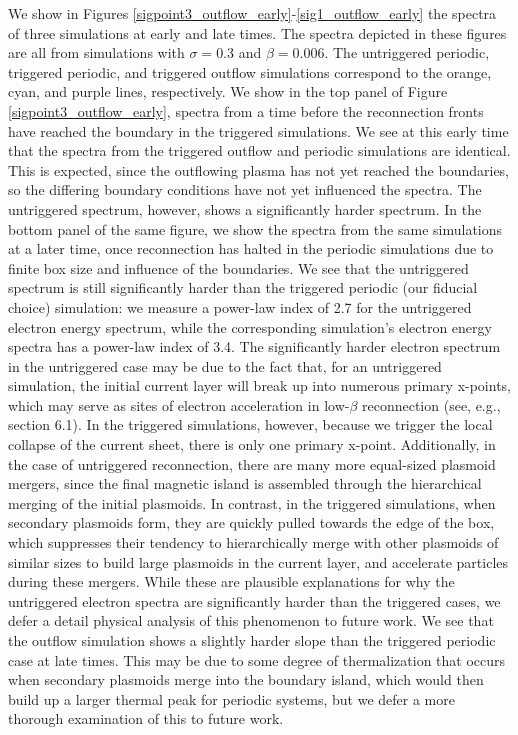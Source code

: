We show in Figures \ref{sigpoint3_outflow_early}-\ref{sig1_outflow_early} the spectra of three simulations at early and late times.  The spectra depicted in these figures are all from simulations with $\sigma=0.3$ and $\beta=0.006$.  The untriggered periodic, triggered periodic, and triggered outflow simulations correspond to the orange, cyan, and purple lines, respectively.  We show in the top panel of Figure \ref{sigpoint3_outflow_early}, spectra from a time before the reconnection fronts have reached the boundary in the triggered simulations.  We see at this early time that the spectra from the triggered outflow and periodic simulations are identical.  This is expected, since the outflowing plasma has not yet reached the boundaries, so the differing boundary conditions have not yet influenced the spectra.  The untriggered spectrum, however, shows a significantly harder spectrum.  In the bottom panel of the same figure, we show the spectra from the same simulations at a later time, once reconnection has halted in the periodic simulations due to finite box size and influence of the boundaries.  We see that the untriggered spectrum is still significantly harder than the triggered periodic (our fiducial choice) simulation: we measure a power-law index of 2.7 for the untriggered electron energy spectrum, while the corresponding simulation's electron energy spectra has a power-law index of 3.4.  The significantly harder electron spectrum in the untriggered case may be due to the fact that, for an untriggered simulation, the initial current layer will break up into numerous primary x-points, which may serve as sites of electron acceleration in low-$\beta$ reconnection (see, e.g., section 6.1).  In the triggered simulations, however, because we trigger the local collapse of the current sheet, there is only one primary x-point.  Additionally, in the case of untriggered reconnection, there are many more equal-sized plasmoid mergers, since the final magnetic island is assembled through the hierarchical merging of the initial plasmoids.  In contrast, in the triggered simulations, when secondary plasmoids form, they are quickly pulled towards the edge of the box, which suppresses their tendency to hierarchically merge with other plasmoids of similar sizes to build large plasmoids in the current layer, and accelerate particles during these mergers.  While these are plausible explanations for why the untriggered electron spectra are significantly harder than the triggered cases, we defer a detail physical analysis of this phenomenon to future work.  We see that the outflow simulation shows a slightly harder slope than the triggered periodic case at late times.  This may be due to some degree of thermalization that occurs when secondary plasmoids merge into the boundary island, which would then build up a larger thermal peak for periodic systems, but we defer a more thorough examination of this to future work.

